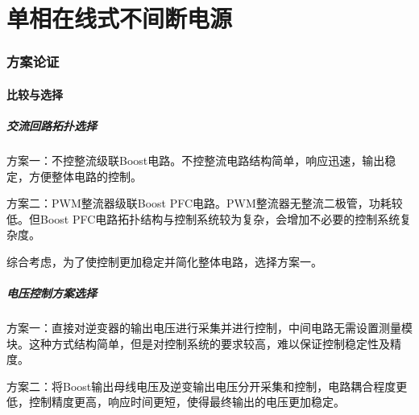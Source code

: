\documentclass[12pt]{ctexart}
\begin{document}
\pagestyle{plain}

\thispagestyle{empty}
\part*{单相在线式不间断电源}


\newpage

\setcounter{page}{2}

\section{方案论证}
\subsection{比较与选择}
\subsubsection{交流回路拓扑选择}
方案一：不控整流级联Boost电路。不控整流电路结构简单，响应迅速，输出稳定，方便整体电路的控制。

方案二：PWM整流器级联Boost PFC电路。PWM整流器无整流二极管，功耗较低。但Boost PFC电路拓扑结构与控制系统较为复杂，会增加不必要的控制系统复杂度。

综合考虑，为了使控制更加稳定并简化整体电路，选择方案一。

\subsubsection{电压控制方案选择}
方案一：直接对逆变器的输出电压进行采集并进行控制，中间电路无需设置测量模块。这种方式结构简单，但是对控制系统的要求较高，难以保证控制稳定性及精度。

方案二：将Boost输出母线电压及逆变输出电压分开采集和控制，电路耦合程度更低，控制精度更高，响应时间更短，使得最终输出的电压更加稳定。
\end{document}
